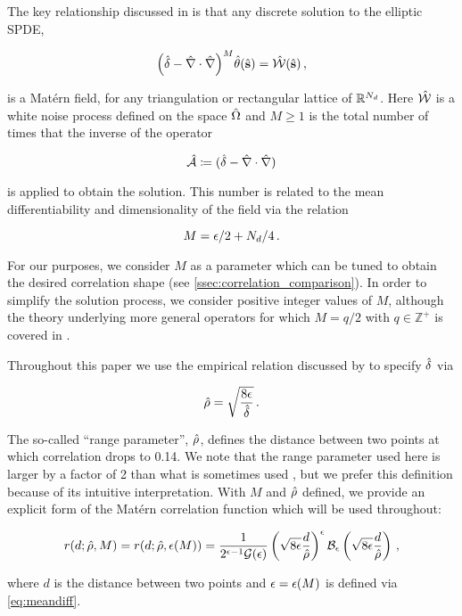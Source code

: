 The key relationship discussed in  is that any discrete solution to
the elliptic SPDE,
\begin{linenomath*}\begin{equation}
    \Big(\hat{\delta} - \hat{\nabla}\cdot\hat{\nabla}\Big)^{M}\hat{\theta}(\hat{\mathbf{s}}) =
    \hat{\mathcal{W}}(\hat{\mathbf{s}}) \, ,
    \label{eq:spde_iso}
\end{equation}\end{linenomath*}
is a Mat\'ern field, for any triangulation or rectangular lattice of $\mathbb{R}^{N_{d}}$.
Here
$\hat{\mathcal{W}}$ is a white noise process defined on the space $\hat{\Omega}$ and
$M\ge 1$ is the total number of times that the inverse of the operator
\begin{linenomath*}\begin{equation*}
\hat{\mathcal{A}} \coloneqq (\hat{\delta} - \hat{\nabla} \cdot \hat{\nabla})
\end{equation*}\end{linenomath*}
is applied to obtain the solution.
This number is related to the mean differentiability and
dimensionality of the field via the relation
\begin{linenomath*}\begin{equation}
    M = \epsilon/2 + N_{d}/4 \, .
    \label{eq:meandiff}
\end{equation}\end{linenomath*}
For our purposes, we consider $M$ as a parameter which can be tuned to obtain the
desired correlation shape (see \cref{ssec:correlation_comparison}).
In order to simplify the solution process, we consider positive integer values
of $M$, although the theory underlying more general operators
for which $M=q/2$ with $q\in\mathbb{Z}^+$ is covered in .

Throughout this paper we use the empirical relation discussed by
 to specify $\hat{\delta}$ via
\begin{linenomath*}\begin{equation}
    \hat{\rho} = \sqrt{\dfrac{8\epsilon}{\hat{\delta}}} \, .
\end{equation}\end{linenomath*}
The so-called ``range parameter'', $\hat{\rho}$, defines the distance between two
points at which correlation drops to 0.14.
We note that the range parameter used here is larger by a factor of 2 than what
is sometimes used \citep[e.g.,][]{rasmussen_gaussian_2006},
but we prefer this definition because of its intuitive interpretation.
With $M$ and $\hat{\rho}$ defined, we provide an explicit form of the Mat\'ern
correlation function which will be used throughout:
\begin{linenomath*}\begin{equation}
    r(d; \hat{\rho}, M) =
    r(d; \hat{\rho}, \epsilon(M)) =
    \dfrac{1}{2^{\epsilon-1}
    \mathcal{G}(\epsilon)}
    \left(\sqrt{8\epsilon} \dfrac{d}{\hat{\rho}}\right)^{\epsilon}
    \mathcal{B}_{\epsilon}
    \left(\sqrt{8\epsilon} \dfrac{d}{\hat{\rho}}\right) \, ,
\end{equation}\end{linenomath*}
where $d$ is the distance between two points and $\epsilon = \epsilon(M)$ is defined via
\cref{eq:meandiff}.

